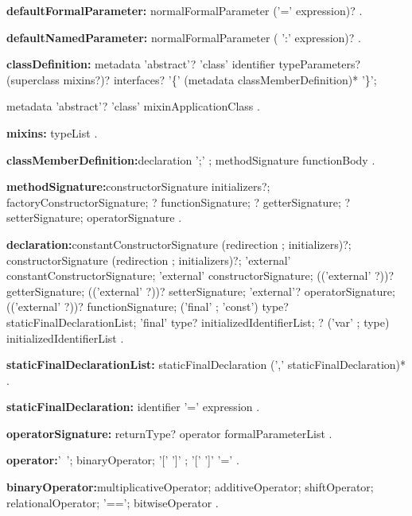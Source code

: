 \begin{grammar}
{\bf defaultFormalParameter:}
      normalFormalParameter ('=' expression)?
    .   
        
{\bf defaultNamedParameter:}
      normalFormalParameter ( ':' expression)?
    .   
\end{grammar}
\begin{grammar}
{\bf classDefinition:}
metadata 'abstract'?  'class' identifier typeParameters? (superclass mixins?)? interfaces?
       '\{' (metadata classMemberDefinition)* '\}';
       
metadata 'abstract'?  'class' mixinApplicationClass
    .
    
{\bf mixins:}
  \WITH{} typeList
  .

{\bf classMemberDefinition:}declaration ';' ;
       methodSignature functionBody
    .

{\bf methodSignature:}constructorSignature initializers?;
      factoryConstructorSignature;
      \STATIC{}? functionSignature;
      \STATIC{}? getterSignature;
      \STATIC{}? setterSignature;
      operatorSignature
    .

{\bf declaration:}constantConstructorSignature (redirection ; initializers)?;
      constructorSignature (redirection ; initializers)?;
      'external' constantConstructorSignature;
      'external' constructorSignature;
      (('external' \STATIC{} ?))? getterSignature;
      (('external' \STATIC{}?))? setterSignature;
      'external'? operatorSignature;
       (('external' \STATIC{}?))? functionSignature;
      \STATIC{} ('final' ; 'const') type? staticFinalDeclarationList;
      'final' type? initializedIdentifierList;
      \STATIC{}? ('var' ; type) initializedIdentifierList
    .

{\bf staticFinalDeclarationList:}
    staticFinalDeclaration (',' staticFinalDeclaration)*
    .

{\bf staticFinalDeclaration:}
      identifier '=' expression
    .

\end{grammar}
\begin{grammar}
{\bf operatorSignature:}
       returnType? \OPERATOR{} operator formalParameterList
       .
       
 {\bf operator:}'~';
      binaryOperator;
      '[' ']' ;
      '[' ']' '='
    .

{\bf binaryOperator:}multiplicativeOperator;
      additiveOperator;
      shiftOperator;
      relationalOperator;
      '==';
      bitwiseOperator
    .
 \end{grammar}

